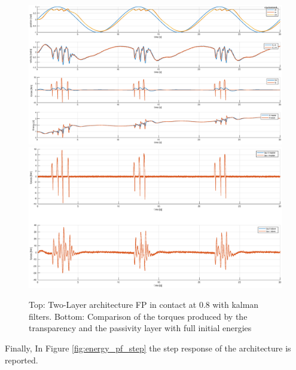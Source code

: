 \documentclass[a4paper,12pt]{article}
\begin{document}
\begin{figure}[H]
    \hspace*{-4.5cm}
    \includegraphics[scale=0.5]{images/energy_pf_kalman.eps}
    \qquad
    \hspace*{-1.5cm}
    \includegraphics[scale=0.4]{images/energy_pf_tau_kalman.eps}
    \caption{Top: Two-Layer architecture FP in contact at 0.8 with kalman filters. Bottom: Comparison of the torques produced by the transparency and the passivity layer with full initial energies}
    \label{fig:energy_pf_kalman}
\end{figure}
\newpage

Finally, In Figure \ref{fig:energy_pf_step} the step response of the architecture is reported.
\end{document}
